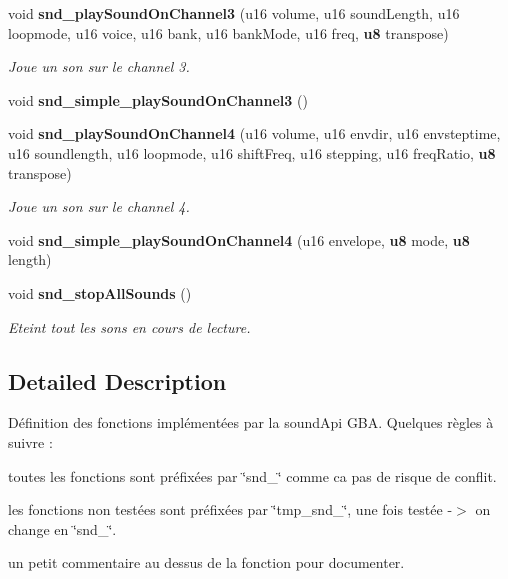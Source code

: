 \begin{DoxyCompactItemize}
\item 
void {\bf snd\_\-playSoundOnChannel3} (u16 volume, u16 soundLength, u16 loopmode, u16 voice, u16 bank, u16 bankMode, u16 freq, {\bf u8} transpose)
\begin{DoxyCompactList}\small\item\em Joue un son sur le channel 3. \item\end{DoxyCompactList}\item 
void {\bfseries snd\_\-simple\_\-playSoundOnChannel3} ()\label{sound_api_8h_a95c122cb1512987eca3990d2b8d246d0}

\item 
void {\bf snd\_\-playSoundOnChannel4} (u16 volume, u16 envdir, u16 envsteptime, u16 soundlength, u16 loopmode, u16 shiftFreq, u16 stepping, u16 freqRatio, {\bf u8} transpose)
\begin{DoxyCompactList}\small\item\em Joue un son sur le channel 4. \item\end{DoxyCompactList}\item 
void {\bfseries snd\_\-simple\_\-playSoundOnChannel4} (u16 envelope, {\bf u8} mode, {\bf u8} length)\label{sound_api_8h_a6bf902300539c7925905d70202bdeac1}

\item 
void {\bf snd\_\-stopAllSounds} ()\label{sound_api_8h_a13ca81dcea5469052d82cf5d94081e76}

\begin{DoxyCompactList}\small\item\em Eteint tout les sons en cours de lecture. \item\end{DoxyCompactList}\end{DoxyCompactItemize}


\subsection{Detailed Description}
Définition des fonctions implémentées par la soundApi GBA. Quelques règles à suivre :


\begin{DoxyItemize}
\item toutes les fonctions sont préfixées par \char`\"{}snd\_\-\char`\"{} comme ca pas de risque de conflit.
\item les fonctions non testées sont préfixées par \char`\"{}tmp\_\-snd\_\-\char`\"{}, une fois testée -\/$>$ on change en \char`\"{}snd\_\-\char`\"{}.
\item un petit commentaire au dessus de la fonction pour documenter. 
\end{DoxyItemize}

